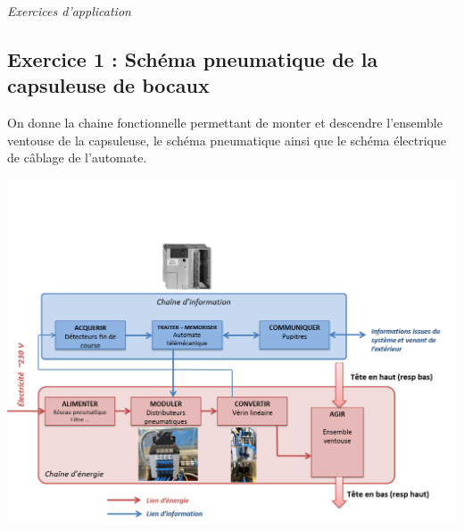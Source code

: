 \documentclass[10pt]{article}
\begin{document}

\begin{center}
\textit{\Large{Exercices d'application}}
\end{center}

\subsection*{Exercice 1 : Schéma pneumatique de la capsuleuse de bocaux}

On donne la chaine fonctionnelle permettant de monter et descendre l'ensemble ventouse de la capsuleuse, le schéma pneumatique ainsi que le schéma électrique de câblage de l'automate.

\begin{center}
\includegraphics[width=.95\textwidth]{images/CECF}
\end{center}
\end{document}
